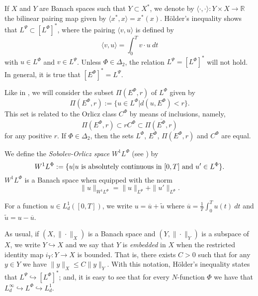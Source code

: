 \documentclass[twoside]{article}
\theoremstyle{remark}
\newcommand{\orlnor}{\|_{L^{\Phi}}}
\newcommand{\lphi}{L^{\Phi}}
\newcommand{\lpsi}{L^{\Psi}}
\newcommand{\ephi}{E^{\Phi}}
\newcommand{\claseor}{C^{\Phi}}
\newcommand{\wphi}{W^{1}\lphi}
\renewcommand{\leq}{\leqslant}
\begin{document}
If $X$ and $Y$ are  Banach spaces such that  $Y\subset X^*$, we denote by $\langle\cdot,\cdot\rangle:Y\times X\to\mathbb{R}$ the bilinear pairing  map given by $\langle x^*,x\rangle=x^*(x)$. H\"older's inequality shows that $\lpsi\subset \left[\lphi\right]^*$, where the pairing
$\langle v, u\rangle$
is defined by 
\begin{equation}\label{pairing}
  \langle v,u\rangle=\int_0^Tv\cdot u\ dt
\end{equation}
with  $u\in\lphi$ and $v\in\lpsi$.
 Unless $\Phi \in \Delta_2$, the relation $\lpsi= \left[\lphi\right]^*$ will not hold. In general, it is true  that  $\left[\ephi\right]^*=\lpsi$.


Like in \cite{KR}, we will consider the subset $\Pi(\ephi,r)$ of $\lphi$ given by
\[\Pi(\ephi,r):=\{u\in\lphi| d(u,\ephi)<r\}.\]
This set is related to the Orlicz class $\claseor$ by means of inclusions, namely,
\begin{equation}\label{inclusiones}\Pi(\ephi, r )\subset r \claseor\subset\overline{\Pi(\ephi,r)}
\end{equation}
for any positive $r$.
If $\Phi \in \Delta_2$,  then the sets $\lphi$, $\ephi$, $\Pi(\ephi,r)$ and $\claseor$ are equal.



We define the \emph{Sobolev-Orlicz space} $\wphi$ (see \cite{adams_sobolev}) by
\[\wphi:=\{u| u \hbox{ is absolutely continuous in $[0,T]$ and } u'\in \lphi\}.\]
$\wphi$ is a Banach space when equipped with the norm
\begin{equation}\label{def-norma-orlicz-sob}
\|  u  \|_{\wphi}= \|  u  \|_{\lphi} + \|u'\orlnor.
\end{equation}



For a  function $u\in L^1_d([0,T])$, we write $u=\overline{u}+\widetilde{u}$ where $\overline{u} =\frac1T\int_0^T u(t)\ dt$ and $\widetilde{u}=u-\overline{u}$.

As usual, if $(X,\|\cdot\|_X)$ is a Banach space and $(Y,\|\cdot \|_Y)$ is a subspace of $X$,  we write $Y\hookrightarrow X$ and we say that $Y$ is \emph{embedded} in $X$  when the restricted identity map $i_Y:Y\to X$ is bounded. That is, there exists $C>0$ such that  for any $y\in Y$ we have $\|y\|_X\leq C\|y\|_Y$.  With this notation, H\"older's inequality states that  $\lpsi\hookrightarrow  \left[\lphi\right]^*$; and, it is easy to see that for every $N$-function $\Phi$ we have that $L^{\infty}_d\hookrightarrow\lphi \hookrightarrow L^1_d$.
\end{document}
